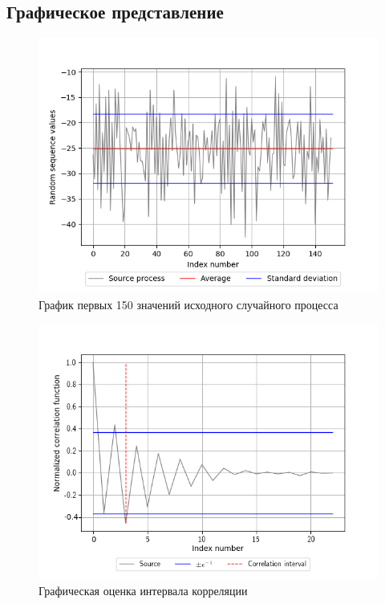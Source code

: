 \documentclass[12pt, fleqn]{article}
\begin{document}
{\begin{enumerate}
{			\subsection{Графическое представление}
			\begin{figure}[H]
			\includegraphics{plot1.png}
			\caption{График первых 150 значений исходного случайного процесса}
			\end{figure}
		      	\begin{figure}[H]
		      		\includegraphics{plot2.png}
		      		\caption{Графическая оценка интервала корреляции}
		      	\end{figure}
		      }
	\end{enumerate}
}
  
\end{document}
